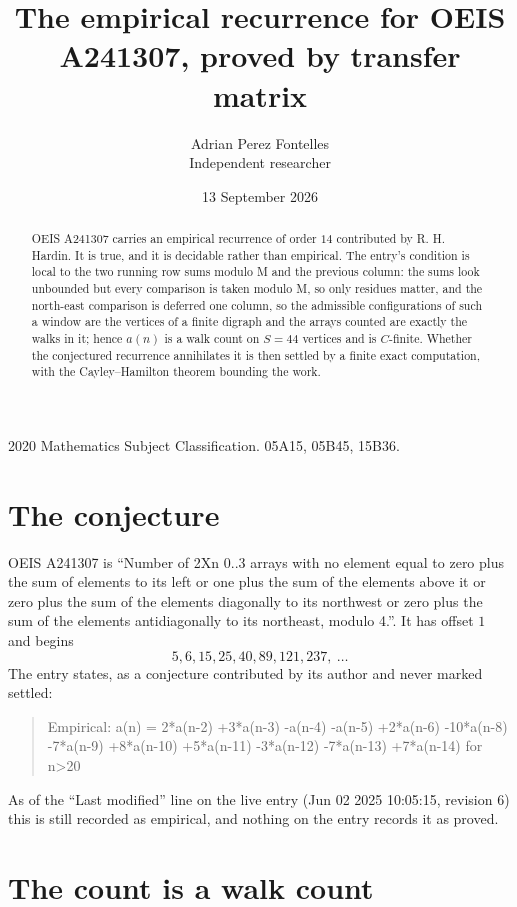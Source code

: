 \documentclass[11pt,a4paper]{article}
\title{The empirical recurrence for OEIS A241307, proved by transfer matrix}
\author{Adrian Perez Fontelles\\ \small Independent researcher}
\date{13 September 2026}
\theoremstyle{plain}
\theoremstyle{definition}
\begin{document}
\maketitle

\begin{abstract}
OEIS A241307 carries an empirical recurrence of order $14$ contributed by R. H. Hardin. It is
true, and it is decidable rather than empirical. The entry's condition is local to the two running row sums modulo M and the previous column: the sums look unbounded but every comparison is taken modulo M, so only residues matter, and the north-east comparison is deferred one column, so
the admissible configurations of such a window are the vertices of a finite digraph and the
arrays counted are exactly the walks in it; hence $a(n)$ is a walk count on $S=44$ vertices
and is $C$-finite. Whether the conjectured recurrence annihilates it is then settled by a
finite exact computation, with the Cayley--Hamilton theorem bounding the work.
\end{abstract}

\noindent\small 2020 Mathematics Subject Classification. 05A15, 05B45, 15B36.\normalsize

\section{The conjecture}

OEIS A241307 is ``Number of 2Xn 0..3 arrays with no element equal to zero plus the sum of elements to its left or one plus the sum of the elements above it or zero plus the sum of the elements diagonally to its northwest or zero plus the sum of the elements antidiagonally to its northeast, modulo 4.''. It has offset $1$ and begins
\[
5, 6, 15, 25, 40, 89, 121, 237,\ \dots
\]
The entry states, as a conjecture contributed by its author and never marked settled:
\begin{quote}
Empirical: a(n) = 2*a(n-2) +3*a(n-3) -a(n-4) -a(n-5) +2*a(n-6) -10*a(n-8) -7*a(n-9) +8*a(n-10) +5*a(n-11) -3*a(n-12) -7*a(n-13) +7*a(n-14) for n>20
\end{quote}
As of the ``Last modified'' line on the live entry (Jun 02 2025 10:05:15, revision 6) this is still
recorded as empirical, and nothing on the entry records it as proved.

\section{The count is a walk count}
\end{document}
